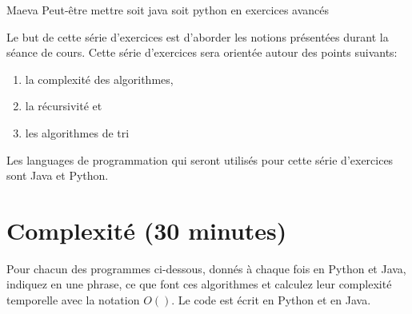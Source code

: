 \begin{note}{Maeva}
    Peut-être mettre soit java soit python en exercices avancés 
\end{note}






\ShowSolutiontrue
\ShowConseiltrue
\titre
{}

Le but de cette série d'exercices est d'aborder les notions présentées durant la séance de cours. Cette série d'exercices sera orientée autour des points suivants:
\begin{enumerate}
    \item la complexité des algorithmes,
    \item la récursivité et
    \item les algorithmes de tri
\end{enumerate}

Les languages de programmation qui seront utilisés pour cette série d'exercices sont Java et Python.


\section{Complexité (30 minutes)}

Pour chacun des programmes ci-dessous, donnés à chaque fois en Python et Java, indiquez en une phrase, ce que font ces algorithmes et calculez leur complexité temporelle avec la notation $O( )$. Le code est écrit en Python et en Java. \\

